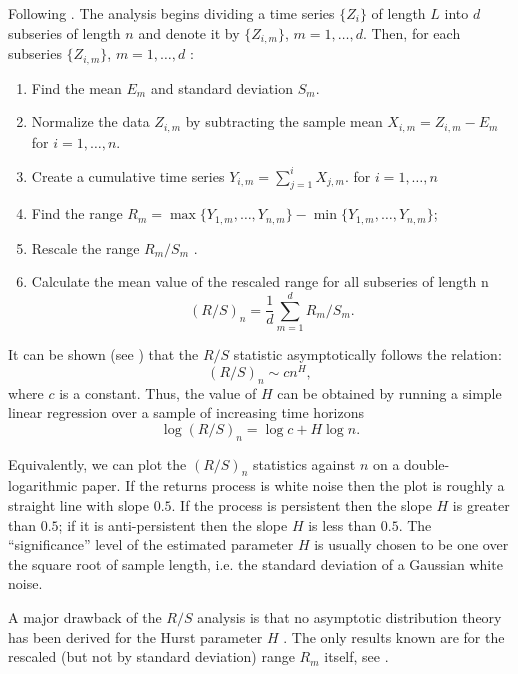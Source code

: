 \documentclass[smallextended]{svjour3}
\begin{document}
Following \cite{we}. The analysis begins  dividing a time series $\{Z_i\}$ of
length $L$ into $d$
subseries of length $n$ and denote it by $\{Z_{i,m}\}$, $m = 1,\ldots,d$. Then,
for each subseries  $\{Z_{i,m}\}$, $m = 1,\ldots,d$ :
\begin{enumerate}
    \item Find the mean $E_m$ and standard deviation $S_m$.
    \item Normalize the data $Z_{i,m}$  by subtracting the sample mean $X_{i,m}
    =Z_{i,m}-E_m$ for $i=1,\ldots,n$.
    \item Create a cumulative time series $Y_{i,m} = \sum_{j=1}^i X_{j,m}$.
    for $i = 1,\ldots,n$
    \item Find the range $R_m = \max\{Y_{1,m},\ldots, Y_{n,m}\} -
    \min\{Y_{1,m},\ldots, Y_{n,m} \}$;
    \item Rescale the range $R_m/S_m$ .

    \item Calculate the mean value of the rescaled range
    for all subseries of length n
    \[
    (R/S)_n =\frac{1}{d}\sum_{m=1}^d  R_m /S_m.
    \]
\end{enumerate}

It can be shown (see \cite{we}) that the $R/S$ statistic asymptotically follows
the relation:
\[
(R/S)_n \sim c n^H,
\]
where $c$ is a constant. Thus, the value of $H$ can be obtained by running a
simple linear regression over a
sample of increasing time horizons
\[
\log(R/S)_n = \log c + H \log n.
\]


Equivalently, we can plot the $(R/S)_n$ statistics against $n$ on a
double-logarithmic paper.
If the returns process is white noise then the plot is roughly a straight line
with slope $0.5$. If the process is persistent then the slope $H$ is greater
than $ 0.5$; if it is anti-persistent
then the slope $H$ is less than  $0.5$. The “significance” level of the
estimated parameter $H$ is usually chosen to be one over the
square root of sample length, i.e. the standard deviation of a Gaussian white
noise.



A major drawback of the $R/S$ analysis is  that no asymptotic distribution
theory has been derived for the Hurst parameter $H$ . The only results known
are for
the rescaled (but not by standard deviation) range $R_m$ itself, see \cite{lo}.
\end{document}
